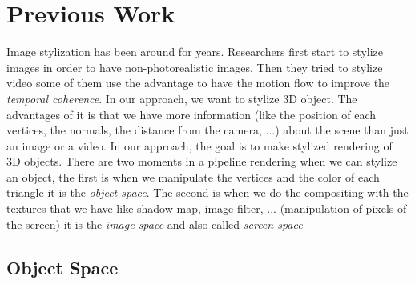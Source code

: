 \chapter{Previous Work}

Image stylization has been around for years. Researchers first start to stylize images \cite{litwinowicz_processing_1997, hays_image_2004, rosin_stroke_2013, zeng_image_2009, kyprianidis_image_2009, lu_interactive_2010, litwinowicz_processing_1997, kyprianidis_state_2013} in order to have non-photorealistic images. Then they tried to stylize video\cite{lin_video_nodate, litwinowicz_processing_1997, kyprianidis_state_2013, bousseau_video_2007} some of them use the advantage to have the motion flow to improve the \textit{temporal coherence}. In our approach, we want to stylize 3D object. The advantages of it is that we have more information (like the position of each vertices, the normals, the distance from the camera, ...) about the scene than just an image or a video. In our approach, the goal is to make stylized rendering of 3D objects. There are two moments in a pipeline rendering when we can stylize an object, the first is when we manipulate the vertices and the color of each triangle it is the \textit{object space}. The second is when we do the compositing with the textures that we have like shadow map, image filter, ... (manipulation of pixels of the screen) it is the \textit{image space} and also called \textit{screen space}

\section{Object Space}


